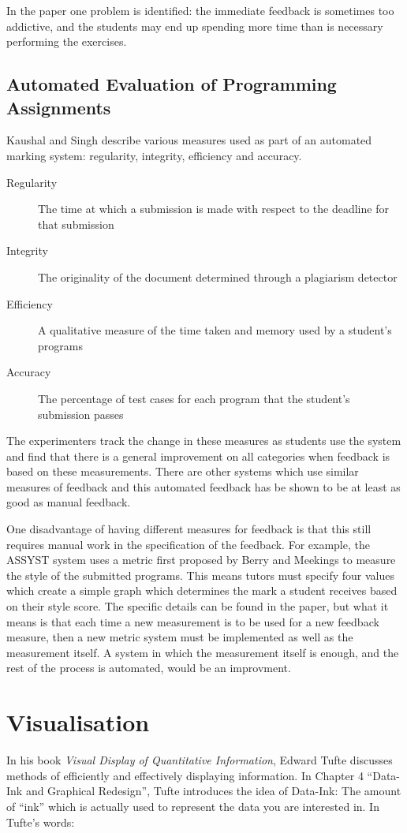 In the paper one problem is identified: the immediate feedback is sometimes too addictive, and the students may end up spending more time than is necessary performing the exercises.

\subsection{Automated Evaluation of Programming Assignments}
Kaushal and Singh describe various measures used as part of an automated marking system: regularity, integrity, efficiency and accuracy\cite{automate_evaluation}. 
\begin{description}
\item[Regularity] The time at which a submission is made with respect to the deadline for that submission
\item[Integrity] The originality of the document determined through a plagiarism detector
\item[Efficiency] A qualitative measure of the time taken and memory used by a student's programs
\item[Accuracy] The percentage of test cases for each program that the student's submission passes
\end{description}

The experimenters track the change in these measures as students use the system and find that there is a general improvement on all categories when feedback is based on these measurements. There are other systems which use similar measures of feedback\cite{ASSYST} and this automated feedback has be shown to be at least as good as manual feedback\cite{coursemaster}.

One disadvantage of having different measures for feedback is that this still requires manual work in the specification of the feedback. For example, the ASSYST system\cite{ASSYST} uses a metric first proposed by Berry and Meekings\cite{berrymeekings} to measure the style of the submitted programs. This means tutors must specify four values which create a simple graph which determines the mark a student receives based on their style score. The specific details can be found in the paper, but what it means is that each time a new measurement is to be used for a new feedback measure, then a new metric system must be implemented as well as the measurement itself. A system in which the measurement itself is enough, and the rest of the process is automated, would be an improvment.

\section{Visualisation}
In his book {\it Visual Display of Quantitative Information}\cite{visual_explanations}, Edward Tufte discusses methods of efficiently and effectively displaying information. In Chapter 4 ``Data-Ink and Graphical Redesign'', Tufte introduces the idea of Data-Ink: The amount of ``ink'' which is actually used to represent the data you are interested in. In Tufte's words:

